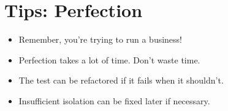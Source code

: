 \documentclass{article}
\begin{document}
\sloppy
\section{Tips: Perfection}
\begin{itemize}
    \item Remember, you're trying to run a business!
    \item Perfection takes a lot of time. Don't waste time.
    \item The test can be refactored if it fails when it shouldn't.
    \item Insufficient isolation can be fixed later if necessary.
\end{itemize}
\end{document}
